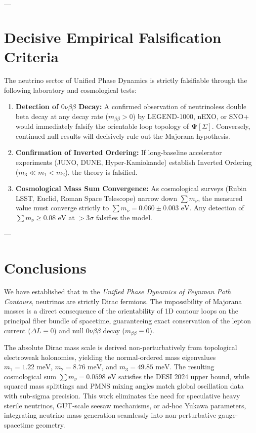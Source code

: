 \documentclass[11pt,a4paper]{article}
\theoremstyle{definition}
\begin{document}
---

\section{Decisive Empirical Falsification Criteria}

The neutrino sector of Unified Phase Dynamics is strictly falsifiable through the following laboratory and cosmological tests:
\begin{enumerate}
    \item \textbf{Detection of $0\nu\beta\beta$ Decay:} A confirmed observation of neutrinoless double beta decay at any decay rate ($m_{\beta\beta} > 0$) by LEGEND-1000, nEXO, or SNO+ would immediately falsify the orientable loop topology of $\mathbf{\Psi}[\Sigma]$. Conversely, continued null results will decisively rule out the Majorana hypothesis.
    \item \textbf{Confirmation of Inverted Ordering:} If long-baseline accelerator experiments (JUNO, DUNE, Hyper-Kamiokande) establish Inverted Ordering ($m_3 \ll m_1 < m_2$), the theory is falsified.
    \item \textbf{Cosmological Mass Sum Convergence:} As cosmological surveys (Rubin LSST, Euclid, Roman Space Telescope) narrow down $\sum m_\nu$, the measured value must converge strictly to $\sum m_\nu = 0.060 \pm 0.003\text{ eV}$. Any detection of $\sum m_\nu \ge 0.08\text{ eV}$ at $> 3\sigma$ falsifies the model.
\end{enumerate}

---

\section{Conclusions}

We have established that in the \textit{Unified Phase Dynamics of Feynman Path Contours}, neutrinos are strictly Dirac fermions. The impossibility of Majorana masses is a direct consequence of the orientability of 1D contour loops on the principal fiber bundle of spacetime, guaranteeing exact conservation of the lepton current ($\Delta L \equiv 0$) and null $0\nu\beta\beta$ decay ($m_{\beta\beta} \equiv 0$). 

The absolute Dirac mass scale is derived non-perturbatively from topological electroweak holonomies, yielding the normal-ordered mass eigenvalues $m_1 = 1.22\text{ meV}$, $m_2 = 8.76\text{ meV}$, and $m_3 = 49.85\text{ meV}$. The resulting cosmological sum $\sum m_\nu = 0.0598\text{ eV}$ satisfies the DESI 2024 upper bound, while squared mass splittings and PMNS mixing angles match global oscillation data with sub-sigma precision. This work eliminates the need for speculative heavy sterile neutrinos, GUT-scale seesaw mechanisms, or ad-hoc Yukawa parameters, integrating neutrino mass generation seamlessly into non-perturbative gauge-spacetime geometry.
\end{document}
